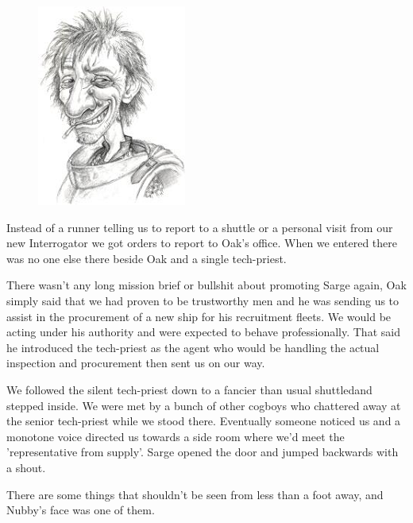\begin{figure}
	\begin{center}
		\includegraphics[width=\figwidth]{pics/6/56.png}
	\end{center}
\end{figure}
Instead of a runner telling us to report to a shuttle or a personal visit from our new Interrogator we got orders to report to Oak's office. 
When we entered there was no one else there beside Oak and a single tech-priest.

There wasn't any long mission brief or bullshit about promoting Sarge again, Oak simply said that we had proven to be trustworthy men and he was sending us to assist in the procurement of a new ship for his recruitment fleets. 
We would be acting under his authority and were expected to behave professionally. 
That said he introduced the tech-priest as the agent who would be handling the actual inspection and procurement then sent us on our way. 

We followed the silent tech-priest down to a fancier than usual shuttledand stepped inside. We were met by a bunch of other cogboys who chattered away at the senior tech-priest while we stood there. 
Eventually someone noticed us and a monotone voice directed us towards a side room where we'd meet the 'representative from supply'. %
Sarge opened the door and jumped backwards with a shout.

There are some things that shouldn't be seen from less than a foot away, and Nubby's face was one of them.


